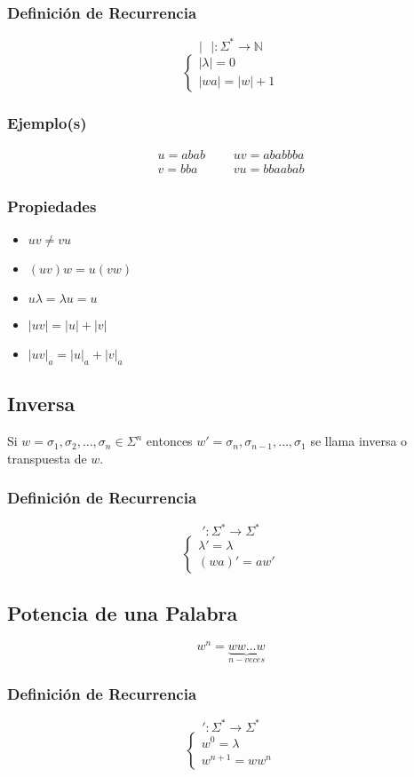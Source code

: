\subsubsection{Definición de Recurrencia}
$$|\text{ }|:\Sigma^*\rightarrow\mathbb{N}$$
$$
\begin{cases}
|\lambda |=0 \\
|wa| = |w| + 1
\end{cases}
$$
\subsubsection{Ejemplo(s)}
\begin{align*}
u=abab & \text{ } &uv=ababbba \\
v=bba  & \text{ } & vu=bbaabab
\end{align*}
\subsubsection{Propiedades}
\begin{itemize}
\item $uv\neq vu$
\item $(uv)w=u(vw)$
\item $u\lambda=\lambda u=u$
\item $|uv|=|u|+|v|$
\item $|uv|_a = |u|_a + |v|_a$
\end{itemize}
\subsection{Inversa}
Si $w=\sigma_1,\sigma_2,\ldots ,\sigma_n \in\Sigma^n$ entonces $w'=\sigma_n,\sigma_{n-1},\ldots ,\sigma_1$ se llama inversa o transpuesta de $w$.
\subsubsection*{Definición de Recurrencia}
$$':\Sigma^*\rightarrow\Sigma^*$$
$$
\begin{cases}
\lambda'=\lambda \\
(wa)' = aw'
\end{cases}
$$
\subsection{Potencia de una Palabra}
$$w^n =  \underbrace{ww\ldots w}_{n-veces}$$
\subsubsection*{Definición de Recurrencia}
$$':\Sigma^*\rightarrow\Sigma^*$$
$$
\begin{cases}
w^0=\lambda \\
w^{n+1} = ww^{n}
\end{cases}
$$
